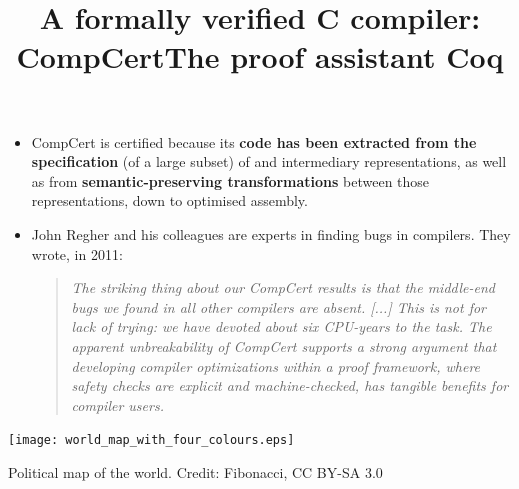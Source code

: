 \documentclass[wide]{slides}
\begin{document}
\begin{slide}
  \title{A formally verified C compiler: CompCert}

  \begin{itemize}

    \item CompCert is certified because its \textbf{\OCaml code has
      been extracted from the specification} (of a large subset) of
      \Clang and intermediary representations, as well as from
      \textbf{semantic\hyp{}preserving transformations} between those
      representations, down to optimised assembly.

    \item John Regher and his colleagues are experts in finding bugs
      in \Clang compilers. They wrote, in 2011:
      \begin{quote}
        \textit{The striking thing about our CompCert results is that
          the middle\hyp{}end bugs we found in all other compilers are
          absent. [...] This is not for lack of trying: we have
          devoted about six CPU\hyp{}years to the task. The apparent
          unbreakability of CompCert supports a strong argument that
          developing compiler optimizations within a proof framework,
          where safety checks are explicit and machine-checked, has
          tangible benefits for compiler users.}
      \end{quote}
  \end{itemize}

\end{slide}

\begin{slide}
  \title{The proof assistant Coq}

   \begin{center}
     \texttt{[image: world\_map\_with\_four\_colours.eps]}
   \end{center}

   \centerline{Political map of the world. Credit: Fibonacci, CC BY-SA
     3.0}

\end{slide}
\end{document}
